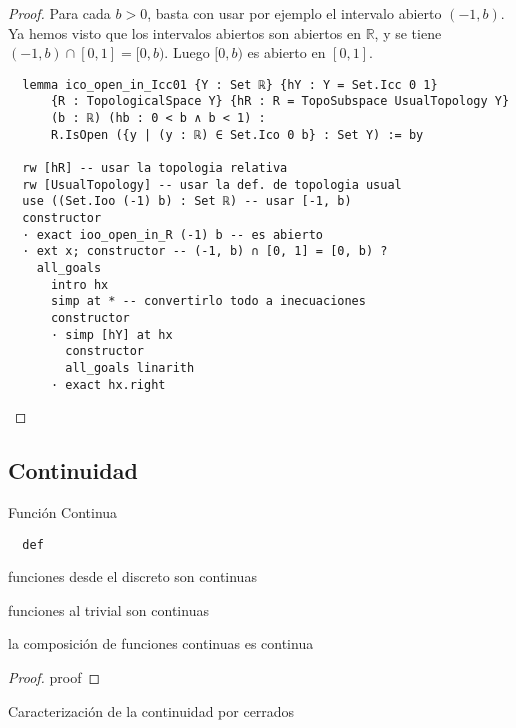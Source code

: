 \begin{proof}
  Para cada $b > 0$, basta con usar por ejemplo el intervalo abierto $(-1, b)$. Ya hemos visto que los intervalos abiertos son abiertos en $\mathbb{R}$, y se tiene $(-1, b) \cap [0, 1] = [0, b)$. Luego $[0, b)$ es abierto en $[0, 1]$.

  \begin{lstlisting}
  lemma ico_open_in_Icc01 {Y : Set ℝ} {hY : Y = Set.Icc 0 1}
      {R : TopologicalSpace Y} {hR : R = TopoSubspace UsualTopology Y}
      (b : ℝ) (hb : 0 < b ∧ b < 1) :
      R.IsOpen ({y | (y : ℝ) ∈ Set.Ico 0 b} : Set Y) := by

  rw [hR] -- usar la topologia relativa
  rw [UsualTopology] -- usar la def. de topologia usual
  use ((Set.Ioo (-1) b) : Set ℝ) -- usar [-1, b)
  constructor
  · exact ioo_open_in_R (-1) b -- es abierto
  · ext x; constructor -- (-1, b) ∩ [0, 1] = [0, b) ?
    all_goals
      intro hx
      simp at * -- convertirlo todo a inecuaciones
      constructor
      · simp [hY] at hx
        constructor
        all_goals linarith
      · exact hx.right \end{lstlisting}
\end{proof}


\subsection{Continuidad}

\begin{definition}
  Función Continua
\end{definition}

\begin{lstlisting}
  def
\end{lstlisting}

\begin{example}
  funciones desde el discreto son continuas
\end{example}

\begin{example}
  funciones al trivial son continuas
\end{example}

\begin{proposition}
  la composición de funciones continuas es continua
\end{proposition}

\begin{proof}
  proof
\end{proof}

\begin{proposition}
  Caracterización de la continuidad por cerrados
\end{proposition}

